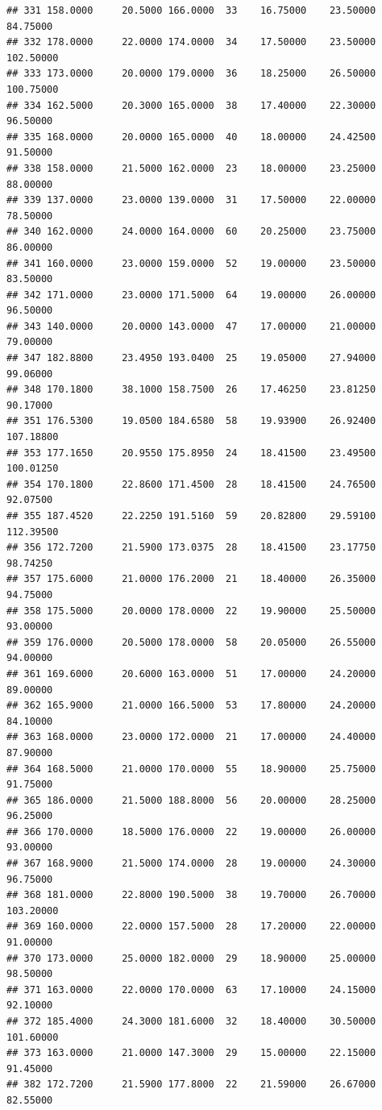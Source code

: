 \documentclass[]{article}
\begin{document}
\begin{verbatim}
## 331 158.0000     20.5000 166.0000  33    16.75000    23.50000  84.75000
## 332 178.0000     22.0000 174.0000  34    17.50000    23.50000 102.50000
## 333 173.0000     20.0000 179.0000  36    18.25000    26.50000 100.75000
## 334 162.5000     20.3000 165.0000  38    17.40000    22.30000  96.50000
## 335 168.0000     20.0000 165.0000  40    18.00000    24.42500  91.50000
## 338 158.0000     21.5000 162.0000  23    18.00000    23.25000  88.00000
## 339 137.0000     23.0000 139.0000  31    17.50000    22.00000  78.50000
## 340 162.0000     24.0000 164.0000  60    20.25000    23.75000  86.00000
## 341 160.0000     23.0000 159.0000  52    19.00000    23.50000  83.50000
## 342 171.0000     23.0000 171.5000  64    19.00000    26.00000  96.50000
## 343 140.0000     20.0000 143.0000  47    17.00000    21.00000  79.00000
## 347 182.8800     23.4950 193.0400  25    19.05000    27.94000  99.06000
## 348 170.1800     38.1000 158.7500  26    17.46250    23.81250  90.17000
## 351 176.5300     19.0500 184.6580  58    19.93900    26.92400 107.18800
## 353 177.1650     20.9550 175.8950  24    18.41500    23.49500 100.01250
## 354 170.1800     22.8600 171.4500  28    18.41500    24.76500  92.07500
## 355 187.4520     22.2250 191.5160  59    20.82800    29.59100 112.39500
## 356 172.7200     21.5900 173.0375  28    18.41500    23.17750  98.74250
## 357 175.6000     21.0000 176.2000  21    18.40000    26.35000  94.75000
## 358 175.5000     20.0000 178.0000  22    19.90000    25.50000  93.00000
## 359 176.0000     20.5000 178.0000  58    20.05000    26.55000  94.00000
## 361 169.6000     20.6000 163.0000  51    17.00000    24.20000  89.00000
## 362 165.9000     21.0000 166.5000  53    17.80000    24.20000  84.10000
## 363 168.0000     23.0000 172.0000  21    17.00000    24.40000  87.90000
## 364 168.5000     21.0000 170.0000  55    18.90000    25.75000  91.75000
## 365 186.0000     21.5000 188.8000  56    20.00000    28.25000  96.25000
## 366 170.0000     18.5000 176.0000  22    19.00000    26.00000  93.00000
## 367 168.9000     21.5000 174.0000  28    19.00000    24.30000  96.75000
## 368 181.0000     22.8000 190.5000  38    19.70000    26.70000 103.20000
## 369 160.0000     22.0000 157.5000  28    17.20000    22.00000  91.00000
## 370 173.0000     25.0000 182.0000  29    18.90000    25.00000  98.50000
## 371 163.0000     22.0000 170.0000  63    17.10000    24.15000  92.10000
## 372 185.4000     24.3000 181.6000  32    18.40000    30.50000 101.60000
## 373 163.0000     21.0000 147.3000  29    15.00000    22.15000  91.45000
## 382 172.7200     21.5900 177.8000  22    21.59000    26.67000  82.55000

\end{verbatim}
\end{document}
